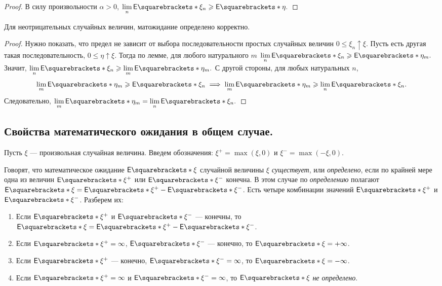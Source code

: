 \begin{enumerate}
\begin{proof}
            В силу произвольности \(\alpha > 0 \), \(\lim\limits_{n}\E{\xi_n} \geq \E{\eta}. \)
        \end{proof}    
    \begin{consequence}
        Для неотрицательных случайных величин, матожидание определено корректно.
    \end{consequence}
    \begin{proof}
        Нужно показать, что предел не зависит от выбора последовательности простых случайных величин \(0 \leq \xi_n \uparrow \xi. \) Пусть есть другая такая последовательность, \(0 \leq \eta \uparrow \xi. \) Тогда по лемме, для любого натурального $ m $ \(\lim\limits_{n}\E{\xi_n} \geq \E{\eta_m}. \) Значит, \(\lim\limits_{n}\E{\xi_n} \geq \lim\limits_{m}\E{\eta_m}. \)
        С другой стороны, для любых натуральных $ n $, \[\lim\limits_{m}\E{\eta_m} \geq \E{\xi_n} \implies \lim\limits_{m}\E{\eta_m} \geq \lim\limits_{n}\E{\xi_n}. \]
        Следовательно, \(\lim\limits_{m}\E{\eta_m} = \lim\limits_{n}\E{\xi_n}. \)
    \end{proof}
\end{enumerate}

\subsection {Свойства математического ожидания в общем случае.}
    Пусть $ \xi $ --- произвольная случайная величина. Введем обозначения: \(\xi^+ = \max(\xi, 0) \) и \(\xi^- = \max(-\xi, 0). \)

\begin{definition}
    Говорят, что математическое ожидание \(\E{\xi} \) случайной величины $ \xi $ \emph{существует}, или \emph{определено}, если по крайней мере одна из величин $ \E{\xi^+} $ или $ \E{\xi^-} $ конечна. В этом случае по \emph{определению} полагают \( \E{\xi} = \E{\xi^+} - \E{\xi^-} \).    
    Есть четыре комбинации значений $ \E{\xi^+} $ и $ \E{\xi^-} $. Разберем их:
    \begin{enumerate}
        \item Если $ \E{\xi^+} $ и $ \E{\xi^-} $ --- конечны, то \( \E{\xi} = \E{\xi^+} - \E{\xi^-} \).
        \item Если  $ \E{\xi^+} = \infty $, $ \E{\xi^-} $ --- конечно, то $ \E{\xi} = +\infty $.
        \item Если  $ \E{\xi^+} $ --- конечно, $ \E{\xi^-} = \infty $, то $ \E{\xi} = -\infty $.
        \item Если  $ \E{\xi^+} = \infty $ и $ \E{\xi^-} = \infty $, то $ \E{\xi} $ \emph{не определено}.
    \end{enumerate}
\end{definition}

